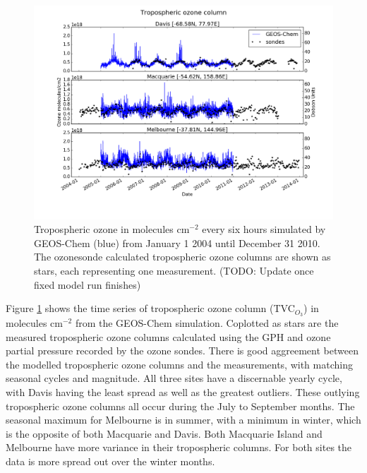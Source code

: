 \documentclass{article}
\begin{document}
  \begin{figure}[!htbp]
    \includegraphics[width=\textwidth]{figures/StationSeries.png}
    \caption{Tropospheric ozone in molecules cm$^{-2}$ every six hours simulated by GEOS-Chem (blue) from January 1 2004 until December 31 2010. The ozonesonde calculated tropospheric ozone columns are shown as stars, each representing one measurement. (TODO: Update once fixed model run finishes)}
    \label{fig:StationSeriesGEOSChem}
  \end{figure}
  
  Figure \ref{fig:StationSeriesGEOSChem} shows the time series of tropospheric ozone column (TVC$_{O_3}$) in molecules cm$^{-2}$ from the GEOS-Chem simulation.
  Coplotted as stars are the measured tropospheric ozone columns calculated using the GPH and ozone partial pressure recorded by the ozone sondes.
  There is good aggreement between the modelled tropospheric ozone columns and the measurements, with matching seasonal cycles and magnitude.
  All three sites have a discernable yearly cycle, with Davis having the least spread as well as the greatest outliers.
  These outlying tropospheric ozone columns all occur during the July to September months.
  The seasonal maximum for Melbourne is in summer, with a minimum in winter, which is the opposite of both Macquarie and Davis.
  Both Macquarie Island and Melbourne have more variance in their tropospheric columns.
  For both sites the data is more spread out over the winter months.
  
\end{document}
